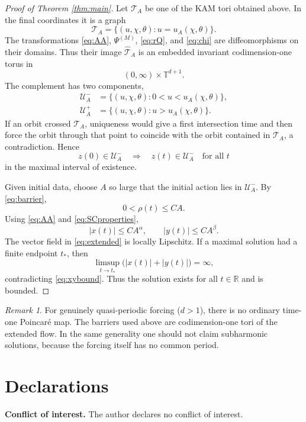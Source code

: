 \documentclass[11pt]{amsart}
\theoremstyle{remark}
\newtheorem{remark}[theorem]{Remark}
\newcommand{\T}{\mathbb T}
\newcommand{\R}{\mathbb R}
\begin{document}
\begin{proof}[Proof of Theorem \ref{thm:main}]
Let $\mathcal T_A$ be one of the KAM tori obtained above.  In the final
coordinates it is a graph
\[
 \mathcal T_A=
 \{(u,\chi,\theta):u=u_A(\chi,\theta)\}.
\]
The transformations \eqref{eq:AA}, $\Psi^{(M)}$,
\eqref{eq:rQ}, and \eqref{eq:chi} are diffeomorphisms on their domains.
Thus their image $\widehat{\mathcal T}_A$ is an embedded invariant
codimension-one torus in
\[
 (0,\infty)\times\T^{d+1}.
\]
The complement has two components,
\begin{align*}
 \mathcal U_A^-&=
 \{(u,\chi,\theta):0<u<u_A(\chi,\theta)\},\\
 \mathcal U_A^+&=
 \{(u,\chi,\theta):u>u_A(\chi,\theta)\}.
\end{align*}
If an orbit crossed $\mathcal T_A$, uniqueness would give a first
intersection time and then force the orbit through that point to coincide
with the orbit contained in $\mathcal T_A$, a contradiction.  Hence
\begin{equation}\label{eq:barrier}
 z(0)\in\mathcal U_A^-\quad\Longrightarrow\quad
 z(t)\in\mathcal U_A^-\quad\text{for all }t
\end{equation}
in the maximal interval of existence.

Given initial data, choose $A$ so large that the initial action lies in
$\mathcal U_A^-$.  By \eqref{eq:barrier},
\[
 0<\rho(t)\leq C A .
\]
Using \eqref{eq:AA} and \eqref{eq:SCproperties},
\begin{equation}\label{eq:xybound}
 |x(t)|\leq C A^\alpha,\qquad
 |y(t)|\leq C A^\beta.
\end{equation}
The vector field in \eqref{eq:extended} is locally Lipschitz.
If a maximal solution had a finite endpoint $t_*$, then
\[
 \limsup_{t\to t_*}\bigl(|x(t)|+|y(t)|\bigr)=\infty,
\]
contradicting \eqref{eq:xybound}.  Thus the solution exists for all
$t\in\R$ and is bounded.
\end{proof}

\begin{remark}
For genuinely quasi-periodic forcing ($d>1$), there is no ordinary
time-one Poincar\'e map.  The barriers used above are codimension-one tori
of the extended flow.  In the same generality one should not claim
subharmonic solutions, because the forcing itself has no common period.
\end{remark}

\section*{Declarations}
\textbf{Conflict of interest.} The author declares no conflict of interest.
\end{document}
